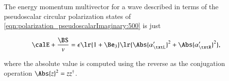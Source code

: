 The energy momentum multivector for a wave described in terms of the pseudoscalar circular polarization states of \cref{eqn:polarization_pseudoscalarImaginary:500} is just

\begin{dmath}\label{eqn:polarization_pseudoscalarImaginary:620}
\calE + \frac{\BS}{v} =
\epsilon \lr{ 1 + \Be_3 } \lr{ \Abs{\alpha_\txtL'}^2 + \Abs{\alpha_\txtR'}^2 },
\end{dmath}

where the absolute value is computed using the reverse as the conjugation operation \( \Abs{z}^2 = z z^\dagger \).

